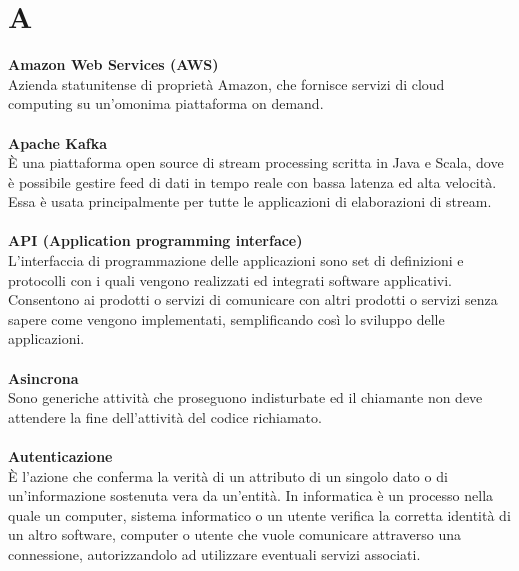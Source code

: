 \section{A}
\textbf{Amazon Web Services (AWS)}\\
Azienda statunitense di proprietà Amazon, che fornisce servizi di cloud computing su un'omonima piattaforma on demand. \\ \\
\textbf{Apache Kafka}\\
È una piattaforma open source di stream processing scritta in Java e Scala, dove è possibile gestire feed di dati in tempo reale con bassa latenza ed alta velocità. Essa è usata principalmente per tutte le applicazioni di elaborazioni di stream.  \\ \\
\textbf{API (Application programming interface)}\\
L'interfaccia di programmazione delle applicazioni sono set di definizioni e protocolli con i quali vengono realizzati ed integrati software applicativi. Consentono ai  prodotti o servizi di comunicare con altri prodotti o servizi senza sapere come vengono implementati, semplificando così lo sviluppo delle applicazioni. \\ \\
\textbf{Asincrona}\\
Sono generiche attività che proseguono indisturbate ed il chiamante non deve attendere la fine dell'attività del codice richiamato. \\ \\
\textbf{Autenticazione}\\
È l’azione che conferma la verità di un attributo di un singolo dato o di un’informazione sostenuta vera da un’entità. In informatica è un processo nella quale un computer, sistema informatico o un utente verifica la corretta identità di un altro software, computer o utente che vuole comunicare attraverso una connessione, autorizzandolo  ad utilizzare eventuali servizi associati. \\ \\
\clearpage